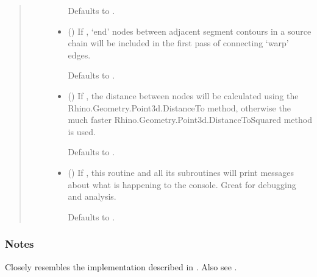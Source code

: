 \documentclass[letterpaper,10pt,english]{sphinxmanual}
\begin{document}
\begin{fulllineitems}
\begin{fulllineitems}
\begin{quote}
\begin{description}
\begin{itemize}
Defaults to .


\item {} 
 (\sphinxstyleliteralemphasis{\sphinxupquote{, }}) \textendash{} 
If , ‘end’ nodes between adjacent segment contours in a
source chain will be included in the first pass of connecting
‘warp’ edges.

Defaults to .


\item {} 
 () \textendash{} 
If , the distance between nodes will be calculated using
the Rhino.Geometry.Point3d.DistanceTo method, otherwise the much
faster Rhino.Geometry.Point3d.DistanceToSquared method is used.

Defaults to .


\item {} 
 (\sphinxstyleliteralemphasis{\sphinxupquote{, }}) \textendash{} 
If , this routine and all its subroutines will print
messages about what is happening to the console. Great for
debugging and analysis.

Defaults to .


\end{itemize}

\end{description}\end{quote}
\subsubsection*{Notes}

Closely resembles the implementation described in  \sphinxfootnotemark[1]. Also see
 \sphinxfootnotemark[2].


\end{fulllineitems}
\end{fulllineitems}
\end{document}
